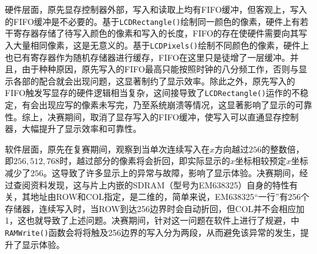 硬件层面，原先显存控制器外部，写入和读取上均有FIFO缓冲，但客观上，写入的FIFO缓冲是不必要的。基于\texttt{LCDRectangle()}绘制同一颜色的像素，硬件上有若干寄存器存储了待写入颜色的像素和写入的长度，FIFO的存在使硬件需要向其写入大量相同像素，这是无意义的。基于\texttt{LCDPixels()}绘制不同颜色的像素，硬件上也已有寄存器作为随机存储器进行缓存，FIFO在这里只是徒增了一层缓冲。并且，由于种种原因，原先写入的FIFO最高只能按照时钟的八分频工作，否则与显示各部的配合就会出现问题，这显著制约了显示效率。除此之外，原先写入的FIFO触发写显存的硬件逻辑相当复杂，这间接导致了\texttt{LCDRectangle()}运作的不稳定，有会出现应写的像素未写完，乃至系统崩溃等情况，这显著影响了显示的可靠性。综上，决赛期间，取消了显存写入的FIFO缓冲，使写入可以直通显存控制器，大幅提升了显示效率和可靠性。

软件层面，原先在复赛期间，观察到当单次连续写入在$x$方向越过$256$的整数倍，即$256, 512, 768$时，越过部分的像素将会折回，即实际显示的$x$坐标相较预定$x$坐标减少了$256$。这导致了许多显示上的异常与故障，影响了显示体验。决赛期间，经过查阅资料发现，这与片上内嵌的SDRAM（型号为EM638325）自身的特性有关，其地址由ROW和COL指定，是二维的，简单来说，EM638325“一行”有256个存储器，连续写入时，当ROW到达256边界时会自动折回，但COL并不会相应加1，这也就导致了上述问题。决赛期间，针对这一问题在软件上进行了规避，中\texttt{RAMWrite()}函数会将将触及256边界的写入分为两段，从而避免该异常的发生，提升了显示体验。